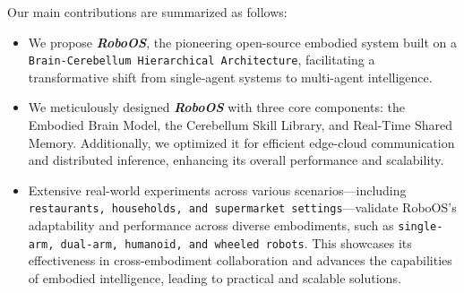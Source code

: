Our main contributions are summarized as follows:

\begin{itemize}[left=1em] %
\item
We propose \textbf{\textit{RoboOS}}, the pioneering open-source embodied system built on a \texttt{Brain-Cerebellum Hierarchical Architecture}, facilitating a transformative shift from single-agent systems to multi-agent intelligence.


\item 
We meticulously designed \textbf{\textit{RoboOS}} with three core components: the Embodied Brain Model, the Cerebellum Skill Library, and Real-Time Shared Memory. Additionally, we optimized it for efficient edge-cloud communication and distributed inference, enhancing its overall performance and scalability.
 
\item 
Extensive real-world experiments across various scenarios—including \texttt{restaurants, households, and supermarket settings}—validate RoboOS's adaptability and performance across diverse embodiments, such as \texttt{single-arm, dual-arm, humanoid, and wheeled robots}. This showcases its effectiveness in cross-embodiment collaboration and advances the capabilities of embodied intelligence, leading to practical and scalable solutions.
\end{itemize}

\clearpage